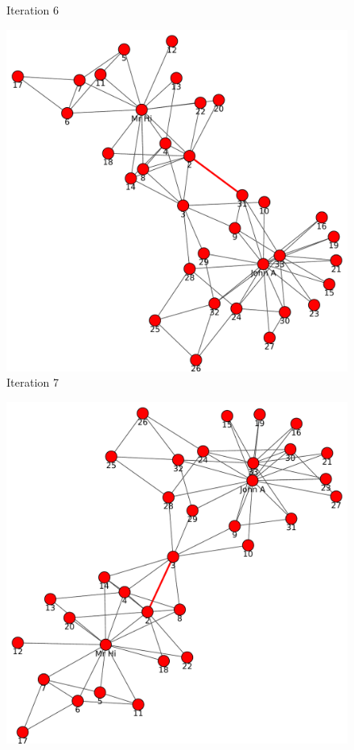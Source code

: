 \begin{itemize}
\begin{figure}[h!]
\begin{center}
\caption{Iteration 6}
\label{fig:q1fig6}
\end{center}
\end{figure}
\newpage
\begin{figure}[h!]
\begin{center}
\includegraphics[scale=0.55, keepaspectratio=true]{figures/graphs/EdgeHighlightedGraph7.pdf}
\caption{Iteration 7}
\label{fig:q1fig7}
\end{center}
\end{figure}
\newpage
\begin{figure}[h!]
\begin{center}
\includegraphics[scale=0.55, keepaspectratio=true]{figures/graphs/EdgeHighlightedGraph8.pdf}

\end{center}
\end{figure}
\end{itemize}
